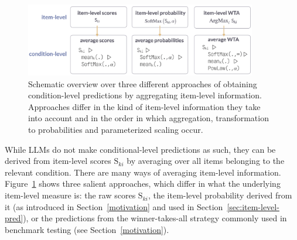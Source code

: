 \documentclass[fleqn]{article}
\begin{document}
\begin{figure}
  \centering
  \includegraphics[width=0.9\textwidth]{00-pics/measures-overview.png}
  \caption{
    Schematic overview over three different approaches of obtaining condition-level predictions by aggregating item-level information.
    Approaches differ in the kind of item-level information they take into account and in the order in which aggregation, transformation to probabilities and parameterized scaling occur.
  }
  \label{fig:measures-overview}
\end{figure}

While LLMs do not make conditional-level predictions as such, they can be derived from item-level scores $\text{S}_{ki}$ by averaging over all items belonging to the relevant condition.
There are many ways of averaging item-level information.
Figure~\ref{fig:measures-overview} shows three salient approaches, which differ in what the underlying item-level measure is: the raw scores $\text{S}_{ki}$, the item-level probability derived from it (as introduced in Section~\ref{motivation} and used in Section~\ref{sec:item-level-pred}), or the predictions from the winner-takes-all strategy commonly used in benchmark testing (see Section~\ref{motivation}).

\end{document}
